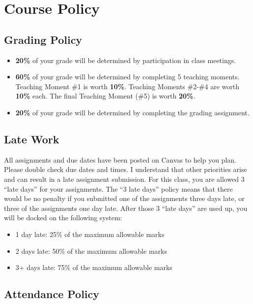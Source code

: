 \documentclass[11pt,]{article}
\providecommand{\tightlist}{%
  \setlength{\itemsep}{0pt}\setlength{\parskip}{0pt}}
\begin{document}
\hypertarget{course-policy}{%
\section{Course Policy}\label{course-policy}}

\hypertarget{grading-policy}{%
\subsection{Grading Policy}\label{grading-policy}}

\begin{itemize}
\item
  \textbf{20\%} of your grade will be determined by participation in
  class meetings.
\item
  \textbf{60\%} of your grade will be determined by completing 5
  teaching moments. Teaching Moment \#1 is worth \textbf{10\%}. Teaching
  Moments \#2-\#4 are worth \textbf{10\%} each. The final Teaching
  Moment (\#5) is worth \textbf{20\%}.
\item
  \textbf{20\%} of your grade will be determined by completing the
  grading assignment.
\end{itemize}

\hypertarget{late-work}{%
\subsection{Late Work}\label{late-work}}

All assignments and due dates have been posted on Canvas to help you
plan. Please double check due dates and times. I understand that other
priorities arise and can result in a late assignment submission. For
this class, you are allowed 3 ``late days'' for your assignments. The
``3 late days'' policy means that there would be no penalty if you
submitted one of the assignments three days late, or three of the
assignments one day late. After those 3 ``late days'' are used up, you
will be docked on the following system:

\begin{itemize}
\tightlist
\item
  1 day late: 25\% of the maximum allowable marks
\item
  2 days late: 50\% of the maximum allowable marks
\item
  3+ days late: 75\% of the maximum allowable marks
\end{itemize}

\hypertarget{attendance-policy}{%
\subsection{Attendance Policy}\label{attendance-policy}}
\end{document}

